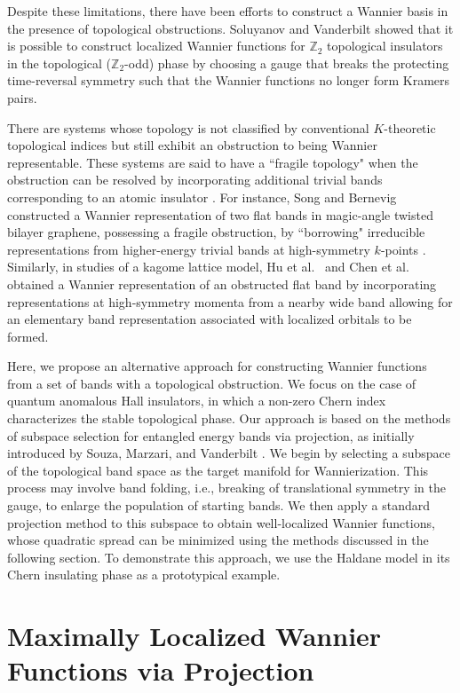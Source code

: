 \documentclass[galley,aps,pra,10pt,amsmath,amssymb,
    superscriptaddress,nofootinbib,longbibliography]{revtex4-2}
\begin{document}
Despite these limitations, there have been efforts to construct a Wannier basis in the presence of topological obstructions. Soluyanov and Vanderbilt \cite{soluyanov2011} showed that it is possible to construct localized Wannier functions for $\mathbb{Z}_2$ topological insulators in the topological ($\mathbb{Z}_2$-odd) phase by choosing a gauge that breaks the protecting time-reversal symmetry such that the Wannier functions no longer form Kramers pairs. 

There are systems whose topology is not classified by conventional $K$-theoretic topological indices but still exhibit an obstruction to being Wannier representable. These systems are said to have a ``fragile topology" when the obstruction can be resolved by incorporating additional trivial bands corresponding to an atomic insulator \cite{po2019, Po2018}. For instance, Song and Bernevig constructed a Wannier representation of two flat bands in magic-angle twisted bilayer graphene, possessing a fragile obstruction, by ``borrowing" irreducible representations from higher-energy trivial bands at high-symmetry $k$-points \cite{song2022}. Similarly, in studies of a kagome lattice model, Hu et al.~\cite{Hu2023} and Chen et al.~\cite{chen2023} obtained a Wannier representation of an obstructed flat band by incorporating representations at high-symmetry momenta from a nearby wide band allowing for an elementary band representation associated with localized orbitals to be formed. 

Here, we propose an alternative approach for constructing Wannier functions from a set of bands with a topological obstruction. We focus on the case of quantum anomalous Hall insulators, in which a non-zero Chern index characterizes the stable topological phase. Our approach is based on the methods of subspace selection for entangled energy bands via projection, as initially introduced by Souza, Marzari, and Vanderbilt \cite{souza2001}. We begin by selecting a subspace of the topological band space as the target manifold for Wannierization. This process may involve band folding, i.e., breaking of translational symmetry in the gauge, to enlarge the population of starting bands. We then apply a standard projection method to this subspace to obtain well-localized Wannier functions, whose quadratic spread can be minimized using the methods discussed in the following section. To demonstrate this approach, we use the Haldane model in its Chern insulating phase as a prototypical example.

\section{Maximally Localized Wannier Functions via Projection}
\label{sec:MLWF}
\end{document}
